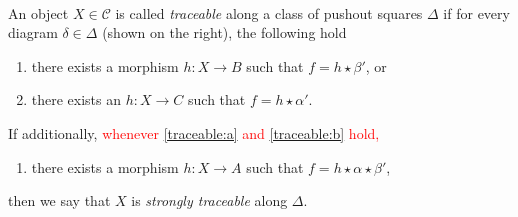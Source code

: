 \begin{definition}
    \label{def:traceability}
    \ \newline
\noindent 
\begin{minipage}{0.5\textwidth}
An object $X \in \mathcal{C}$ is called \emph{traceable} along a class of pushout squares $\Delta$ if for every diagram $\delta \in \Delta$ (shown on the right), the following hold
\end{minipage}
\begin{minipage}{0.5\textwidth}
\begin{center}
\end{center}
\end{minipage}
    \begin{enumerate}[label=(\alph*)]
        \item\label{traceable:a} there exists a morphism $h : X \to B$ such that $f = h \star \beta'$, or
        \item\label{traceable:b} there exists an $h : X \to C$ such that $f = h \star \alpha'$.
    \end{enumerate}
    If additionally, 
    \textcolor{red}{whenever \ref{traceable:a} and \ref {traceable:b} hold,} 
    \begin{enumerate}[label=(\alph*),resume]
        \item 
        there exists a morphism $h : X \to A$ such that $f = h \star \alpha \star \beta' $,
    \end{enumerate}
    then we say that $X$ is \emph{strongly traceable} along $\Delta$.
\end{definition}